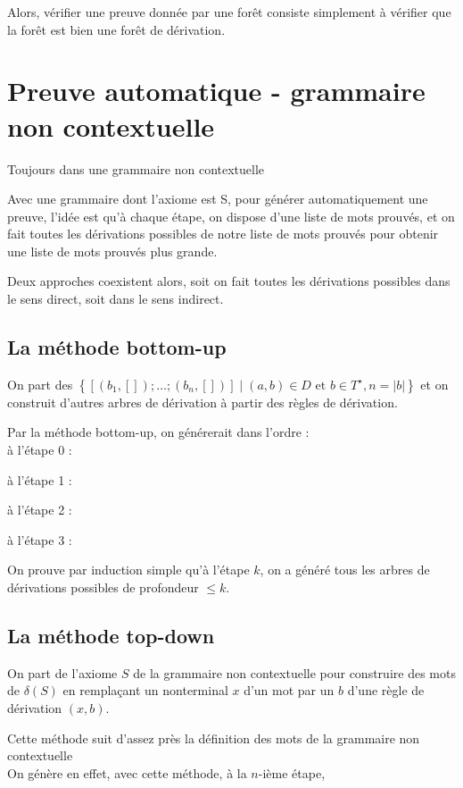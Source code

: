 \documentclass[a4paper,12pt]{article}
\newcommand{\norm}[1]{\lvert #1 \rvert}
\begin{document}

Alors, vérifier une preuve donnée par une forêt consiste simplement à vérifier que la forêt est bien une forêt de dérivation.

\section{Preuve automatique - grammaire non contextuelle}

Toujours dans une grammaire non contextuelle

Avec une grammaire dont l'axiome est S,
pour générer automatiquement une preuve, l'idée est qu'à chaque étape,
on dispose d'une liste de mots prouvés,
et on fait toutes les dérivations possibles de notre liste de mots prouvés pour obtenir une liste de mots prouvés plus grande.

Deux approches coexistent alors, soit on fait toutes les dérivations possibles dans le sens direct, soit dans le sens indirect.

\subsection{La méthode bottom-up}

On part des $\left\{ [(b_1,[]);\dots;(b_n,[])] \mid (a,b)\in D \text{ et } b \in T^\star , n = \norm{b}\right\}$ et on construit d'autres arbres de dérivation à partir des règles de dérivation.

Par la méthode bottom-up, on générerait dans l'ordre :\\
à l'étape 0 :
 
à l'étape 1 : 
 
à l'étape 2 : 
 
à l'étape 3 : 
 

On prouve par induction simple qu'à l'étape $k$, on a généré tous les arbres de dérivations possibles de profondeur $\leq k$.

\subsection{La méthode top-down}

On part de l'axiome $S$ de la grammaire non contextuelle pour construire des mots de $\delta(S)$ en remplaçant un nonterminal $x$ d'un mot par un $b$ d'une règle de dérivation $(x,b)$.

Cette méthode suit d'assez près la définition des mots de la grammaire non contextuelle\\
On génère en effet, avec cette méthode, à la $n$-ième étape, 
\end{document}
